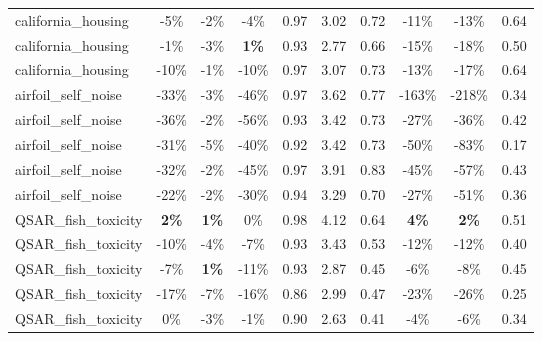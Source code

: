 \begin{table}[!htbp]
\begin{small}
\begin{sc}
{\begin{tabular}{lccccccccc}
california\_housing & -5\% & -2\% & -4\% & 0.97 & 3.02 & 0.72 & -11\% & -13\% & 0.64 \\
california\_housing & -1\% & -3\% & \textbf{1\%} & 0.93 & 2.77 & 0.66 & -15\% & -18\% & 0.50 \\
california\_housing & -10\% & -1\% & -10\% & 0.97 & 3.07 & 0.73 & -13\% & -17\% & 0.64 \\
airfoil\_self\_noise & -33\% & -3\% & -46\% & 0.97 & 3.62 & 0.77 & -163\% & -218\% & 0.34 \\
airfoil\_self\_noise & -36\% & -2\% & -56\% & 0.93 & 3.42 & 0.73 & -27\% & -36\% & 0.42 \\
airfoil\_self\_noise & -31\% & -5\% & -40\% & 0.92 & 3.42 & 0.73 & -50\% & -83\% & 0.17 \\
airfoil\_self\_noise & -32\% & -2\% & -45\% & 0.97 & 3.91 & 0.83 & -45\% & -57\% & 0.43 \\
airfoil\_self\_noise & -22\% & -2\% & -30\% & 0.94 & 3.29 & 0.70 & -27\% & -51\% & 0.36 \\
QSAR\_fish\_toxicity & \textbf{2\%} & \textbf{1\%} & 0\% & 0.98 & 4.12 & 0.64 & \textbf{4\%} & \textbf{2\%} & 0.51 \\
QSAR\_fish\_toxicity & -10\% & -4\% & -7\% & 0.93 & 3.43 & 0.53 & -12\% & -12\% & 0.40 \\
QSAR\_fish\_toxicity & -7\% & \textbf{1\%} & -11\% & 0.93 & 2.87 & 0.45 & -6\% & -8\% & 0.45 \\
QSAR\_fish\_toxicity & -17\% & -7\% & -16\% & 0.86 & 2.99 & 0.47 & -23\% & -26\% & 0.25 \\
QSAR\_fish\_toxicity & 0\% & -3\% & -1\% & 0.90 & 2.63 & 0.41 & -4\% & -6\% & 0.34 \\
\bottomrule
\end{tabular}
}
\end{sc}
\end{small}
\end{table}
